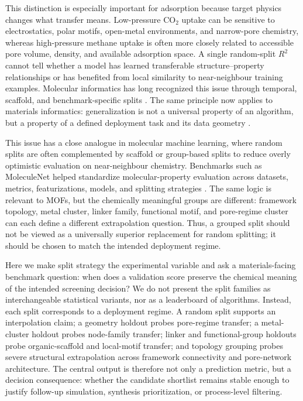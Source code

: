 \documentclass[11pt,a4paper]{article}
\begin{document}
This distinction is especially important for adsorption because target physics changes what transfer means. Low-pressure CO$_2$ uptake can be sensitive to electrostatics, polar motifs, open-metal environments, and narrow-pore chemistry, whereas high-pressure methane uptake is often more closely related to accessible pore volume, density, and available adsorption space. A single random-split $R^2$ cannot tell whether a model has learned transferable structure--property relationships or has benefited from local similarity to near-neighbour training examples. Molecular informatics has long recognized this issue through temporal, scaffold, and benchmark-specific splits \citep{Sheridan2013TimeSplit,Wallach2018Memorization,Wu2018MoleculeNet}. The same principle now applies to materials informatics: generalization is not a universal property of an algorithm, but a property of a defined deployment task and its data geometry \citep{Koh2021WILDS,Li2025OODMaterials}.

This issue has a close analogue in molecular machine learning, where random splits are often complemented by scaffold or group-based splits to reduce overly optimistic evaluation on near-neighbour chemistry. Benchmarks such as MoleculeNet helped standardize molecular-property evaluation across datasets, metrics, featurizations, models, and splitting strategies \citep{Wu2018MoleculeNet}. The same logic is relevant to MOFs, but the chemically meaningful groups are different: framework topology, metal cluster, linker family, functional motif, and pore-regime cluster can each define a different extrapolation question. Thus, a grouped split should not be viewed as a universally superior replacement for random splitting; it should be chosen to match the intended deployment regime.

Here we make split strategy the experimental variable and ask a materials-facing benchmark question: when does a validation score preserve the chemical meaning of the intended screening decision? We do not present the split families as interchangeable statistical variants, nor as a leaderboard of algorithms. Instead, each split corresponds to a deployment regime. A random split supports an interpolation claim; a geometry holdout probes pore-regime transfer; a metal-cluster holdout probes node-family transfer; linker and functional-group holdouts probe organic-scaffold and local-motif transfer; and topology grouping probes severe structural extrapolation across framework connectivity and pore-network architecture. The central output is therefore not only a prediction metric, but a decision consequence: whether the candidate shortlist remains stable enough to justify follow-up simulation, synthesis prioritization, or process-level filtering.
\end{document}
